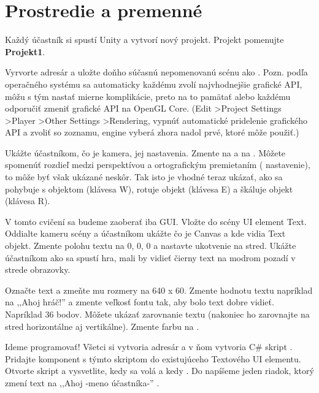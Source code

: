 \chapter{Prostredie a premenné}

Každý účastník si spustí Unity a vytvorí nový projekt. Projekt pomenujte \textbf{Projekt1}.

Vyrvorte adresár  a uložte doňho súčasnú nepomenovanú scénu ako . Pozn. podľa operačného systému sa automaticky každému zvolí najvhodnejšie grafické API, môžu s tým nastať mierne komplikácie, preto na to pamätať alebo každému odporučiť zmeniť grafické API na OpenGL Core. (Edit \textgreater Project Settings \textgreater Player \textgreater Other Settings \textgreater Rendering, vypnúť automatické pridelenie grafického API a zvoliť so zoznamu, engine vyberá zhora nadol prvé, ktoré môže použiť.)

Ukážte účastníkom, čo je kamera, jej nastavenia. Zmente  na   a  na . Môžete spomenúť rozdieľ medzi perspektívou a ortografickým premietaním ( nastavenie), to môže byť však ukázané neskôr. Tak isto je vhodné teraz ukázať, ako sa pohybuje s objektom (klávesa W), rotuje objekt (klávesa E) a škáluje objekt (klávesa R).

V tomto cvičení sa budeme zaoberať iba GUI. Vložte do scény UI element Text. Oddialte kameru scény a účastníkom ukážte čo je Canvas a kde vidia Text objekt. Zmente polohu textu na 0, 0, 0 a nastavte ukotvenie na stred. Ukážte účastníkom ako sa spustí hra, mali by vidieť čierny text na modrom pozadí v strede obrazovky.

Označte text a zmeňte mu rozmery na 640 x 60. Zmente hodnotu textu napríklad na ,,Ahoj hráč!'' a zmente veľkosť fontu tak, aby bolo text dobre vidieť. Napríklad 36 bodov. Môžete ukázať zarovnanie textu (nakoniec ho zarovnajte na stred horizontálne aj vertikálne). Zmente farbu na .

Ideme programovať! Všetci si vytvoria adresár  a v ňom vytvoria C\# skript . Pridajte komponent s týmto skriptom do existujúceho Textového UI elementu. Otvorte skript a vysvetlite, kedy sa volá  a kedy . Do  napíšeme jeden riadok, ktorý zmení text na ,,Ahoj -meno účastníka-'' .

\clearpage


